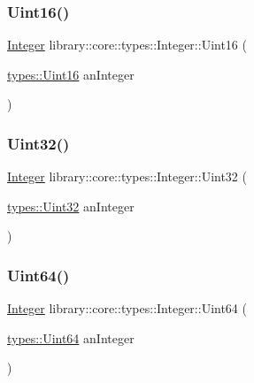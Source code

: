 \mbox{\label{classlibrary_1_1core_1_1types_1_1_integer_a53066966128ecd2baf683522f94ccea5}} 
\subsubsection{\texorpdfstring{Uint16()}{Uint16()}}
{\footnotesize\ttfamily \mbox{\hyperlink{classlibrary_1_1core_1_1types_1_1_integer}{Integer}} library\+::core\+::types\+::\+Integer\+::\+Uint16 (\begin{DoxyParamCaption}\item[{\mbox{\hyperlink{namespacelibrary_1_1core_1_1types_a058aff3dd2661e18ff83255059561123}{types\+::\+Uint16}}}]{an\+Integer }\end{DoxyParamCaption})\hspace{0.3cm}{\ttfamily [static]}}

\mbox{\label{classlibrary_1_1core_1_1types_1_1_integer_a984b7dc2e65c1ef8ef8082f5ddfa91d4}} 
\subsubsection{\texorpdfstring{Uint32()}{Uint32()}}
{\footnotesize\ttfamily \mbox{\hyperlink{classlibrary_1_1core_1_1types_1_1_integer}{Integer}} library\+::core\+::types\+::\+Integer\+::\+Uint32 (\begin{DoxyParamCaption}\item[{\mbox{\hyperlink{namespacelibrary_1_1core_1_1types_a17d56f5d789f5d86d10828c112c77be2}{types\+::\+Uint32}}}]{an\+Integer }\end{DoxyParamCaption})\hspace{0.3cm}{\ttfamily [static]}}

\mbox{\label{classlibrary_1_1core_1_1types_1_1_integer_a40a248a917f52487caf542010dda9ef8}} 
\subsubsection{\texorpdfstring{Uint64()}{Uint64()}}
{\footnotesize\ttfamily \mbox{\hyperlink{classlibrary_1_1core_1_1types_1_1_integer}{Integer}} library\+::core\+::types\+::\+Integer\+::\+Uint64 (\begin{DoxyParamCaption}\item[{\mbox{\hyperlink{namespacelibrary_1_1core_1_1types_a52eb5d32552dff72468cc9acee3dd70e}{types\+::\+Uint64}}}]{an\+Integer }\end{DoxyParamCaption})\hspace{0.3cm}{\ttfamily [static]}}


